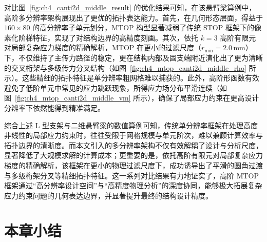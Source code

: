 对比图~\ref{fig:ch4_canti2d_middle_result} 的优化结果可知，在该悬臂梁算例中，高阶多分辨率架构展现出了更优的拓扑表达能力。首先，在几何形态层面，得益于 $160 \times 80$ 的高分辨率子单元划分，MTOP 构型显著减弱了传统 STOP 框架下的像素化阶梯特征，实现了对结构边界的高精度刻画。其次，依托 $k=3$ 高阶有限元对局部复杂应力梯度的精确解析，MTOP 在更小的过滤尺度（$r_{\min} = 2.0\,\mathrm{mm}$）下，不仅维持了主传力路径的稳定，更在结构内部及固支端附近演化出了更为清晰的交叉桁架与多级传力分叉结构（如图~\ref{fig:ch4_mtop_canti2d_middle_rho} 所示）。这些精细的拓扑特征是单分辨率粗网格难以捕获的。此外，高阶形函数有效避免了低阶单元中常见的应力跳跃现象，所得应力场分布平滑连续（如图~\ref{fig:ch4_mtop_canti2d_middle_vm} 所示），确保了局部应力约束在更高设计分辨率下依然能得到精准满足。

综合上述 L 型支架与二维悬臂梁的数值算例可知，传统单分辨率框架在处理高度非线性的局部应力约束时，往往受限于网格规模与单元阶次，难以兼顾计算效率与拓扑边界的清晰度。而本文引入的多分辨率架构不仅有效解耦了设计与分析尺度，显著降低了大规模求解的计算成本；更重要的是，依托高阶有限元对局部复杂应力梯度的精确解析，该框架在更小的物理过滤尺度下，成功诱导出了平滑的圆角过渡与多级桁架分叉等精细拓扑特征。这一系列对比结果有力地证实了，高阶 MTOP 框架通过“高分辨率设计空间”与“高精度物理分析”的深度协同，能够极大拓展复杂应力约束问题的几何表达边界，并显著提升最终的结构设计精度。


\section{本章小结}
\label{sec:ch4_summary}


